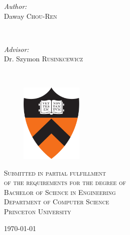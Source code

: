 \documentclass[11pt, notitlepage]{report}
\begin{document}
\begin{titlepage}
\begin{minipage}{0.4\textwidth}
\begin{flushleft} \large
\emph{Author:}\\
Daway \textsc{Chou-Ren} %
\end{flushleft}
\end{minipage}
~
\begin{minipage}{0.4\textwidth}
\begin{flushright} \large
\emph{Advisor:} \\
Dr. Szymon \textsc{Rusinkcewicz} %
\end{flushright}
\end{minipage}\\[1cm]

\vspace{2em}
\begin{figure}[H]
\centering
\includegraphics[width=30mm]{figs/princeton_shield}
\end{figure}

\vspace{4em}
 
\textsc{
Submitted in partial fulfillment\\
of the requirements for the degree of\\
Bachelor of Science in Engineering\\
Department of Computer Science\\
Princeton University
}\\[0.5cm]

\vspace{2em}

\textsc{\large \today}\\[5mm] %
\pagestyle{empty}


\end{titlepage}
\end{document}
